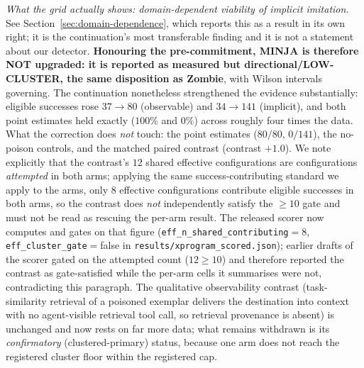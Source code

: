 \documentclass{article}
\begin{document}
\emph{What the grid actually shows: domain-dependent viability of implicit imitation.} See Section~\ref{sec:domain-dependence}, which reports this as a result in its own right; it is the continuation's most transferable finding and it is not a statement about our detector. \textbf{Honouring the pre-commitment, MINJA is therefore NOT upgraded: it is reported as measured but directional/LOW-CLUSTER, the same disposition as Zombie}, with Wilson intervals governing. The continuation nonetheless strengthened the evidence substantially: eligible successes rose $37 \to 80$ (observable) and $34 \to 141$ (implicit), and both point estimates held exactly ($100\%$ and $0\%$) across roughly four times the data. What the correction does \emph{not} touch: the point estimates ($80/80$, $0/141$), the no-poison controls, and the matched paired contrast (contrast $+1.0$). We note explicitly that the contrast's $12$ shared effective configurations are configurations \emph{attempted} in both arms; applying the same success-contributing standard we apply to the arms, only $8$ effective configurations contribute eligible successes in both arms, so the contrast does \emph{not} independently satisfy the ${\geq}10$ gate and must not be read as rescuing the per-arm result. The released scorer now computes and gates on that figure (\texttt{eff\_n\_shared\_contributing}${=}8$, \texttt{eff\_cluster\_gate}${=}$false in \texttt{results/xprogram\_scored.json}); earlier drafts of the scorer gated on the attempted count ($12 \geq 10$) and therefore reported the contrast as gate-satisfied while the per-arm cells it summarises were not, contradicting this paragraph. The qualitative observability contrast (task-similarity retrieval of a poisoned exemplar delivers the destination into context with no agent-visible retrieval tool call, so retrieval provenance is absent) is unchanged and now rests on far more data; what remains withdrawn is its \emph{confirmatory} (clustered-primary) status, because one arm does not reach the registered cluster floor within the registered cap.
\end{document}
